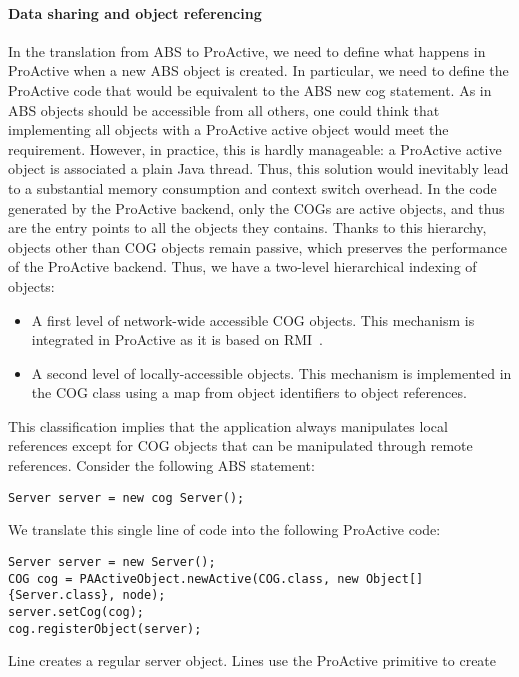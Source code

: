 \paragraph{Data sharing and object referencing}
In the translation from ABS to ProActive, we need to define what happens in ProActive when a new ABS object is created. In particular, we need to define the ProActive code that would be equivalent to the ABS new cog statement.
As in ABS objects should be accessible from all others, one could think that implementing all objects with a ProActive active object would meet the requirement. However, in practice, this is hardly manageable: a ProActive active object is associated a plain Java thread. Thus, this solution would inevitably lead to a substantial memory consumption and context switch overhead.
In the code generated by the ProActive backend, only the COGs are active objects, and thus are the entry points to all the objects they contains. Thanks to this hierarchy, objects other than COG objects remain passive, which preserves the performance of the ProActive backend.
Thus, we have a two-level hierarchical indexing of objects:
\begin{itemize}
\item A first level of network-wide accessible COG objects. This mechanism is integrated in ProActive as it is based on RMI~\cite{Wollrath:1996:DOM:1268049.1268066}.
\item A second level of locally-accessible objects. This mechanism is implemented in the COG class using a map from object identifiers to object references.
\end{itemize}
This classification implies that the application always manipulates local references except for COG objects that can be manipulated through remote references.
Consider the following ABS  statement:
\lstset{ numberstyle=\tiny, stepnumber=1, numbersep=2pt, basicstyle=\ttfamily\scriptsize, keywordstyle=\bfseries,
    showstringspaces=false}
\begin{lstlisting}
Server server = new cog Server();
\end{lstlisting}
We translate this single line of code into the following ProActive code:
\begin{lstlisting}
Server server = new Server();			
COG cog = PAActiveObject.newActive(COG.class, new Object[]{Server.class}, node);			
server.setCog(cog);				
cog.registerObject(server);	
\end{lstlisting}
Line  creates a regular server object. Lines
 use the  ProActive primitive to create
